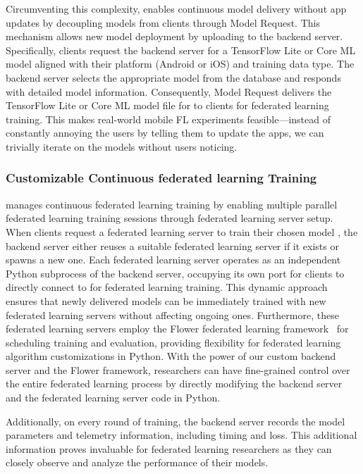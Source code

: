 Circumventing this complexity,
\fedkit enables continuous model delivery without app updates by decoupling
models from clients through Model Request. This mechanism allows new model
deployment by uploading to the backend server. Specifically,
clients request the backend server for a TensorFlow Lite or Core ML model
aligned with their platform (Android or iOS) and training data type.
The backend server selects the appropriate model \model{}
from the database and responds with detailed model information. Consequently,
Model Request delivers the TensorFlow Lite or Core ML model file for \model{}
to clients for federated learning training.
This makes real-world mobile FL experiments feasible---instead of constantly
annoying the users by telling them to update the apps,
we can trivially iterate on the models without users noticing.

\subsubsection{Customizable Continuous federated learning Training}
\fedkit manages continuous federated learning training by enabling multiple
parallel federated learning training sessions through federated learning server
setup.
When clients request a federated learning server to train their chosen model
\model{},
the backend server either reuses a suitable federated learning server \fs{}
if it exists or spawns a new one.
Each federated learning server operates as an independent Python subprocess of
the backend server,
occupying its own port for clients to directly connect to for federated learning
training.
This dynamic approach ensures that newly delivered models can be immediately
trained with new federated learning servers without affecting ongoing ones.
Furthermore,
these federated learning servers employ the Flower federated learning
framework~\cite{beutel2020flower} for scheduling training and evaluation,
providing flexibility for federated learning algorithm customizations in Python.
With the power of our custom backend server and the Flower framework,
researchers can have fine-grained control over the entire federated learning
process by directly modifying the backend server and the federated learning
server code in Python.

Additionally, on every round of training,
the backend server records the model parameters and telemetry information,
including timing and loss.
This additional information proves invaluable for federated learning researchers
as they can closely observe and analyze the performance of their models.
